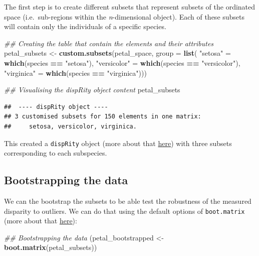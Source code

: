 \documentclass[]{book}
\newenvironment{Shaded}{\begin{snugshade}}{\end{snugshade}}
\newcommand{\CommentTok}[1]{\textcolor[rgb]{0.56,0.35,0.01}{\textit{#1}}}
\newcommand{\DataTypeTok}[1]{\textcolor[rgb]{0.13,0.29,0.53}{#1}}
\newcommand{\KeywordTok}[1]{\textcolor[rgb]{0.13,0.29,0.53}{\textbf{#1}}}
\newcommand{\NormalTok}[1]{#1}
\newcommand{\OperatorTok}[1]{\textcolor[rgb]{0.81,0.36,0.00}{\textbf{#1}}}
\newcommand{\StringTok}[1]{\textcolor[rgb]{0.31,0.60,0.02}{#1}}
\begin{document}
The first step is to create different subsets that represent subsets of the ordinated space (i.e.~sub-regions within the \emph{n}-dimensional object).
Each of these subsets will contain only the individuals of a specific species.

\begin{Shaded}
\begin{Highlighting}[]
\CommentTok{## Creating the table that contain the elements and their attributes}
\NormalTok{petal_subsets <-}\StringTok{ }\KeywordTok{custom.subsets}\NormalTok{(petal_space, }\DataTypeTok{group =} \KeywordTok{list}\NormalTok{(}
                                \StringTok{"setosa"}\NormalTok{ =}\StringTok{ }\KeywordTok{which}\NormalTok{(species }\OperatorTok{==}\StringTok{ "setosa"}\NormalTok{),}
                                \StringTok{"versicolor"}\NormalTok{ =}\StringTok{ }\KeywordTok{which}\NormalTok{(species }\OperatorTok{==}\StringTok{ "versicolor"}\NormalTok{),}
                                \StringTok{"virginica"}\NormalTok{ =}\StringTok{ }\KeywordTok{which}\NormalTok{(species }\OperatorTok{==}\StringTok{ "virginica"}\NormalTok{)))}

\CommentTok{## Visualising the dispRity object content}
\NormalTok{petal_subsets}
\end{Highlighting}
\end{Shaded}

\begin{verbatim}
##  ---- dispRity object ---- 
## 3 customised subsets for 150 elements in one matrix:
##     setosa, versicolor, virginica.
\end{verbatim}

This created a \texttt{dispRity} object (more about that \protect\hyperlink{guts}{here}) with three subsets corresponding to each subspecies.

\hypertarget{bootstrapping-the-data}{%
\subsection{Bootstrapping the data}\label{bootstrapping-the-data}}

We can the bootstrap the subsets to be able test the robustness of the measured disparity to outliers.
We can do that using the default options of \texttt{boot.matrix} (more about that \protect\hyperlink{bootstraps-and-rarefactions}{here}):

\begin{Shaded}
\begin{Highlighting}[]
\CommentTok{## Bootstrapping the data}
\NormalTok{(petal_bootstrapped <-}\StringTok{ }\KeywordTok{boot.matrix}\NormalTok{(petal_subsets))}
\end{Highlighting}
\end{Shaded}
\end{document}
